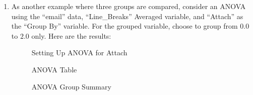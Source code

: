 \begin{enumerate}
\begin{enumerate}
\begin{itemize}
    \end{itemize}
    
  \end{enumerate}
  
  \item As another example where three groups are compared, consider an ANOVA using the ``email'' data, ``Line\_Breaks'' Averaged variable, and ``Attach'' as the ``Group By'' variable. For the grouped variable, choose to group from $ 0.0 $ to $ 2.0 $ only. Here are the results:
  
  \begin{figure}[H]
    \begin{center}
      \caption{Setting Up ANOVA for Attach}
    \end{center}
  \end{figure}

  \begin{figure}[H]
    \begin{center}
      \caption{ANOVA Table}
    \end{center}
  \end{figure}
  
  \begin{figure}[H]
    \begin{center}
      \caption{ANOVA Group Summary}
    \end{center}
  \end{figure}
  
\end{enumerate}


